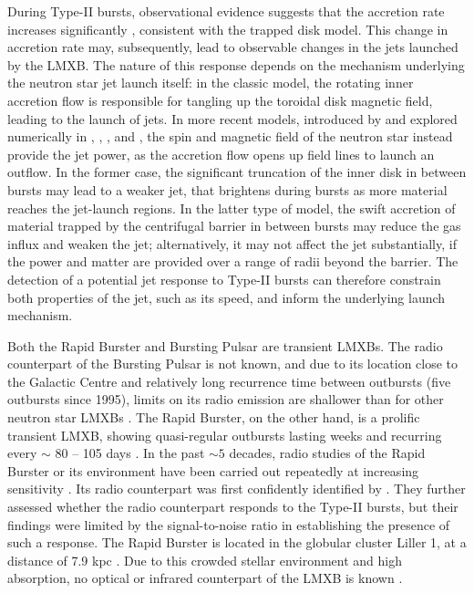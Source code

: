 \documentclass[fleqn,usenatbib]{mnras}
\begin{document}
During Type-II bursts, observational evidence suggests that the accretion rate increases significantly \citep{bagnoli2015,court2018}, consistent with the trapped disk model. This change in accretion rate may, subsequently, lead to observable changes in the jets launched by the LMXB. The nature of this response depends on the mechanism underlying the neutron star jet launch itself: in the classic \citet{blandford1982} model, the rotating inner accretion flow is responsible for tangling up the toroidal disk magnetic field, leading to the launch of jets. In more recent models, introduced by \citet{parfrey2016} and explored numerically in \citet{das2022}, \citet{parfrey2023}, \citet{berthier2024}, and \citet{das2024}, the spin and magnetic field of the neutron star instead provide the jet power, as the accretion flow opens up field lines to launch an outflow. In the former case, the significant truncation of the inner disk in between bursts may lead to a weaker jet, that brightens during bursts as more material reaches the jet-launch regions. In the latter type of model, the swift accretion of material trapped by the centrifugal barrier in between bursts may reduce the gas influx and weaken the jet; alternatively, it may not affect the jet substantially, if the power and matter are provided over a range of radii beyond the barrier. The detection of a potential jet response to Type-II bursts can therefore constrain both properties of the jet, such as its speed, and inform the underlying launch mechanism. 

Both the Rapid Burster and Bursting Pulsar are transient LMXBs. The radio counterpart of the Bursting Pulsar is not known, and due to its location close to the Galactic Centre and relatively long recurrence time between outbursts (five outbursts since 1995), limits on its radio emission are shallower than for other neutron star LMXBs \citep{russell2017,vandeneijnden2021}. The Rapid Burster, on the other hand, is a prolific transient LMXB, showing quasi-regular outbursts lasting weeks and recurring every $\sim$ 80 -- 105 days \citep{guerriero1999}. In the past $\sim 5$ decades, radio studies of the Rapid Burster or its environment have been carried out repeatedly at increasing sensitivity \citep{johnson1978,rao1980,grindlay1986,johnston1991,tudor2022}. Its radio counterpart was first confidently identified by \citet{moore2000}. They further assessed whether the radio counterpart responds to the Type-II bursts, but their findings were limited by the signal-to-noise ratio in establishing the presence of such a response. The Rapid Burster is located in the globular cluster Liller 1, at a distance of 7.9 kpc \citep{valenti2010}. Due to this crowded stellar environment and high absorption, no optical or infrared counterpart of the LMXB is known \citep{homer2001}. 
\end{document}
